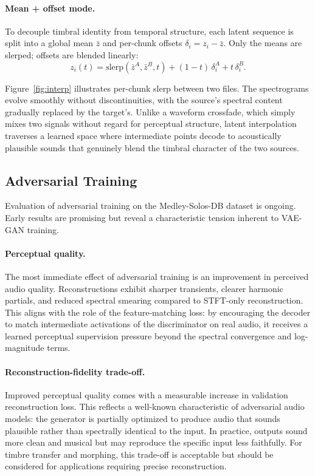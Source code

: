 \documentclass[10pt, twocolumn]{article}
\begin{document}
\paragraph{Mean + offset mode.}
To decouple timbral identity from temporal structure, each latent sequence
is split into a global mean $\bar{z}$ and per-chunk offsets
$\delta_i = z_i - \bar{z}$. Only the means are slerped; offsets are blended linearly:
\begin{equation}
    z_i(t) = \text{slerp}(\bar{z}^A, \bar{z}^B, t)
            + (1-t)\,\delta_i^A + t\,\delta_i^B.
    \label{eq:meanoffset}
\end{equation}

Figure~\ref{fig:interp} illustrates per-chunk slerp between two files.
The spectrograms evolve smoothly without discontinuities, with the
source's spectral content gradually replaced by the target's.
Unlike a waveform crossfade, which simply mixes two signals without
regard for perceptual structure, latent interpolation traverses a learned
space where intermediate points decode to acoustically plausible sounds
that genuinely blend the timbral character of the two sources.

\subsection{Adversarial Training}

Evaluation of adversarial training on the Medley-Solos-DB dataset is ongoing.
Early results are promising but reveal a characteristic tension inherent to VAE-GAN training.

\paragraph{Perceptual quality.}
The most immediate effect of adversarial training is an improvement in perceived audio quality.
Reconstructions exhibit sharper transients, clearer harmonic partials,
and reduced spectral smearing compared to STFT-only reconstruction.
This aligns with the role of the feature-matching loss:
by encouraging the decoder to match intermediate activations of the discriminator on real audio,
it receives a learned perceptual supervision pressure beyond the spectral convergence and log-magnitude terms.

\paragraph{Reconstruction-fidelity trade-off.}
Improved perceptual quality comes with a measurable increase in validation reconstruction loss.
This reflects a well-known characteristic of adversarial audio models:
the generator is partially optimized to produce audio that sounds plausible rather than spectrally identical to the input.
In practice, outputs sound more clean and musical but may reproduce the specific input less faithfully.
For timbre transfer and morphing, this trade-off is acceptable
but should be considered for applications requiring precise reconstruction.
\end{document}
